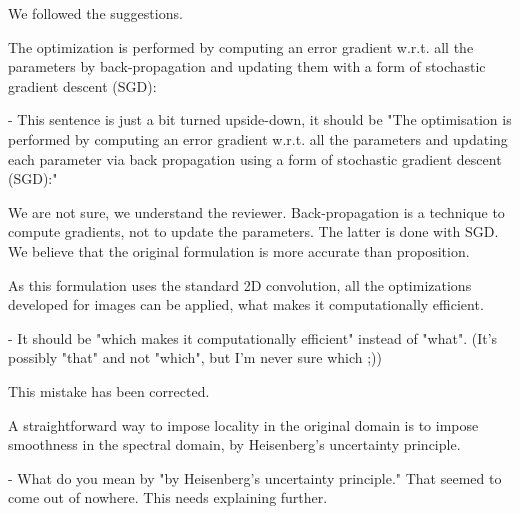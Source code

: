 \documentclass[12pt,a4paper]{article}
\newcommand{\nati}[1]{{\color[rgb]{.1,.6,.1}{NP: #1}}}
\newcommand{\mdeff}[1]{{\color[rgb]{.1,.6,.1}{MD: #1}}}
\newcommand{\todo}[1]{{\color[rgb]{.6,.1,.6}{TODO: #1}}}
\newcommand{\1}{\b{1}}              %
\newcommand{\0}{\b{0}}              %
\begin{document}
We followed the suggestions.

\begin{mdframed}[style=comment]
The optimization is performed by computing an error gradient w.r.t. all the parameters by back-propagation and updating them with a form of stochastic gradient descent (SGD):

- This sentence is just a bit turned upside-down, it should be "The optimisation is performed by computing an error gradient w.r.t. all the parameters and updating each parameter via back propagation using a form of stochastic gradient descent (SGD):"
\end{mdframed}

We are not sure, we understand the reviewer.
Back-propagation is a technique to compute gradients, not to update the parameters.
The latter is done with SGD.
We believe that the original formulation is more accurate than proposition.

\begin{mdframed}[style=comment]
As this formulation uses the standard 2D convolution, all the optimizations developed for images can be applied, what makes it computationally efficient.

- It should be "which makes it computationally efficient" instead of "what". (It's possibly "that" and not "which", but I'm never sure which ;))
\end{mdframed}

This mistake has been corrected.

\begin{mdframed}[style=comment]
A straightforward way to impose locality in the original domain is to impose smoothness in the spectral domain, by Heisenberg’s uncertainty principle.

- What do you mean by "by Heisenberg’s uncertainty principle." That seemed to come out of nowhere. This needs explaining further.
\end{mdframed}
\end{document}
